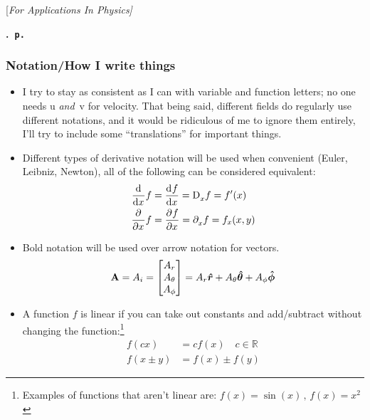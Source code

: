 [\sl For Applications In Physics]
\author{\EC}
\date{\today}
\fancyhf{}
\fancyhead[LO,RE]{\small\sl\leftmark}
\setlength\headheight{17pt}

\maketitle
\begingroup
    \parindent 0cm \parfillskip 0cm \leftskip 0cm \rightskip 0cm
    \etocframedstyle[1]{}
                  {}
                  {} {\Large\bf\etocnumber.~\etocname\hfill\nobreak\tt p.~\makebox[12 pt][r]{\etocpage}\par}
                  {\vspace{-0.25cm}}
    \tableofcontents\label{toc:FirstPage}
\endgroup
\newpage
\subsubsection*{Notation/How I write things}  
    \begin{itemize}
    \item I try to stay as consistent as I can with variable and function letters; no one needs u {\sl and\/}~v for velocity. That being said, different fields do regularly use different notations, and it would be ridiculous of me to ignore them entirely, I'll try to include some ``translations'' for important things.
    \item
    Different types of derivative notation will be used when convenient (Euler, Leibniz, Newton), all of the following can be considered equivalent: 
    \begin{align*}
        \der{x}f&=\der{f}{x}=\der*{x}f=f'(x)
        \\
        \pder{x}f&=\pder{f}{x}=\pder*{x}f=f_x(x,y)
    \end{align*}
    \item Bold notation will be used over arrow notation for vectors.  
    \begin{equation*}
        \vb{A}= A_i=
        \begin{bmatrix}
        A_r
        \\
        A_\theta
        \\
        A_\phi
        \end{bmatrix} =A_r\e{r}+A_\theta\e{\theta}+A_\phi\e{\phi}
    \end{equation*}   
    \item A function $f$ is linear if you can take out constants and add/subtract without changing the function:\footnote{Examples of functions that aren't linear are: \(f(x)=\sin(x)\,,\,f(x)= x^2\)}
    \begin{align*}
        f(cx)&=cf(x)\quad c\in \mathbb{R}
        \\
        f(x\pm y)&=f(x)\pm f(y)
    \end{align*}
    \end{itemize}
\newpage{} %
\endinput